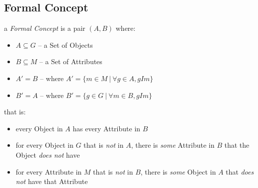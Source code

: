 \subsection{Formal Concept}\label{sec:formal_concept}

a \emph{Formal Concept} is a pair $(A,B)$ where:
\begin{itemize}
  \item $A \subseteq G$ -- a Set of Objects
  \item $B \subseteq M$ -- a Set of Attributes
  \item $A' = B$ -- where $A' = \{ m \in M \ |\ \forall g \in A, gIm \}$
  \item $B' = A$ -- where $B' = \{ g \in G \ |\ \forall m \in B, gIm \}$
\end{itemize}
that is:
\begin{itemize}
  \item every Object in $A$ has every Attribute in $B$
  \item for every Object in $G$ that is \emph{not} in $A$, there is
    \emph{some} Attribute in $B$ that the Object \emph{does not} have
  \item for every Attribute in $M$ that is \emph{not} in $B$, there is
    \emph{some} Object in $A$ that \emph{does not} have that Attribute
\end{itemize}
